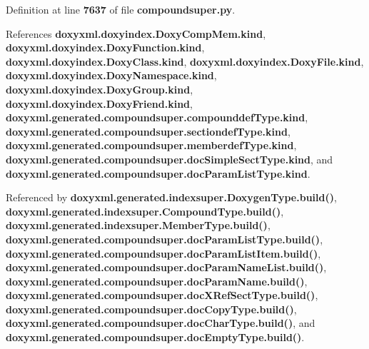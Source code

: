 Definition at line {\bf 7637} of file {\bf compoundsuper.\+py}.



References {\bf doxyxml.\+doxyindex.\+Doxy\+Comp\+Mem.\+kind}, {\bf doxyxml.\+doxyindex.\+Doxy\+Function.\+kind}, {\bf doxyxml.\+doxyindex.\+Doxy\+Class.\+kind}, {\bf doxyxml.\+doxyindex.\+Doxy\+File.\+kind}, {\bf doxyxml.\+doxyindex.\+Doxy\+Namespace.\+kind}, {\bf doxyxml.\+doxyindex.\+Doxy\+Group.\+kind}, {\bf doxyxml.\+doxyindex.\+Doxy\+Friend.\+kind}, {\bf doxyxml.\+generated.\+compoundsuper.\+compounddef\+Type.\+kind}, {\bf doxyxml.\+generated.\+compoundsuper.\+sectiondef\+Type.\+kind}, {\bf doxyxml.\+generated.\+compoundsuper.\+memberdef\+Type.\+kind}, {\bf doxyxml.\+generated.\+compoundsuper.\+doc\+Simple\+Sect\+Type.\+kind}, and {\bf doxyxml.\+generated.\+compoundsuper.\+doc\+Param\+List\+Type.\+kind}.



Referenced by {\bf doxyxml.\+generated.\+indexsuper.\+Doxygen\+Type.\+build()}, {\bf doxyxml.\+generated.\+indexsuper.\+Compound\+Type.\+build()}, {\bf doxyxml.\+generated.\+indexsuper.\+Member\+Type.\+build()}, {\bf doxyxml.\+generated.\+compoundsuper.\+doc\+Param\+List\+Type.\+build()}, {\bf doxyxml.\+generated.\+compoundsuper.\+doc\+Param\+List\+Item.\+build()}, {\bf doxyxml.\+generated.\+compoundsuper.\+doc\+Param\+Name\+List.\+build()}, {\bf doxyxml.\+generated.\+compoundsuper.\+doc\+Param\+Name.\+build()}, {\bf doxyxml.\+generated.\+compoundsuper.\+doc\+X\+Ref\+Sect\+Type.\+build()}, {\bf doxyxml.\+generated.\+compoundsuper.\+doc\+Copy\+Type.\+build()}, {\bf doxyxml.\+generated.\+compoundsuper.\+doc\+Char\+Type.\+build()}, and {\bf doxyxml.\+generated.\+compoundsuper.\+doc\+Empty\+Type.\+build()}.




